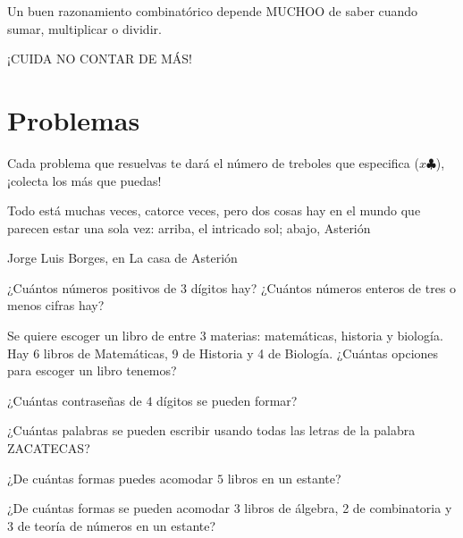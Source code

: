 Un buen razonamiento combinatórico depende MUCHOO de saber 
cuando sumar, multiplicar o dividir.

\begin{moral}
    ¡CUIDA NO CONTAR DE MÁS!
\end{moral}

\newpage

\section{Problemas}

Cada problema que resuelvas te dará el número de treboles 
que especifica ($x \clubsuit$), ¡colecta los más que puedas!

\epigraph{Todo está muchas veces, catorce veces, pero dos cosas hay en el 
mundo que parecen estar una sola vez: arriba, el intricado sol; abajo, 
Asterión}{Jorge Luis Borges, en La casa de Asterión}

\begin{problem}[$2 \clubsuit$]
    ¿Cuántos números positivos de 3 dígitos hay? ¿Cuántos 
    números enteros de tres o menos cifras hay?
\end{problem}

\begin{problem}[$2 \clubsuit$]
    Se quiere escoger un libro de entre 3 materias: matemáticas, historia 
    y biología. Hay 6 libros de Matemáticas, 9 de Historia y 4 de Biología. 
    ¿Cuántas opciones para escoger un libro tenemos?
\end{problem}

\begin{problem}[$2 \clubsuit$]
    ¿Cuántas contraseñas de $4$ dígitos se pueden formar?
\end{problem}

\begin{problem}[$2 \clubsuit$]
    ¿Cuántas palabras se pueden escribir usando todas las letras de la 
    palabra ZACATECAS?
\end{problem}

\begin{problem}[$2 \clubsuit$]
    ¿De cuántas formas puedes acomodar $5$ libros en un 
    estante?
\end{problem}

\begin{problem}[$2 \clubsuit$]
    ¿De cuántas formas se pueden acomodar 3 libros de álgebra, 
    2 de combinatoria y 3 de teoría de números en un estante?
\end{problem}

